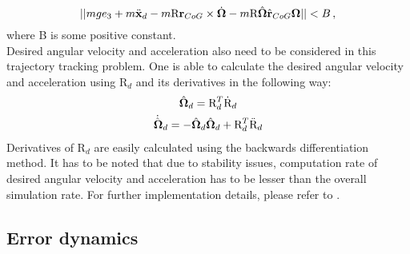 \begin{equation}
	|| mge_3 + m\ddot{\textbf{x}}_d 
	- m\text{R}\textbf{r}_{CoG}  \times \dot{\boldsymbol{\Omega}} - m\text{R}\hat{\boldsymbol{\Omega}}\hat{\textbf{r}}_{CoG}\boldsymbol{\Omega}|| < B \, , \label{condition2}
\end{equation}
where B is some positive constant. \\
\indent Desired angular velocity and acceleration also need to be considered in this trajectory tracking problem. One is able to calculate the desired angular velocity and acceleration using $\text{R}_d$ and its derivatives in the following way:
\begin{gather}
	\hat{\boldsymbol{\Omega}}_d = \text{R}_d^T \dot{\text{R}}_d \\
	\dot{\hat{\boldsymbol{\Omega}}}_d = - \hat{\boldsymbol{\Omega}}_d\hat{\boldsymbol{\Omega}}_d + \text{R}_d^T \ddot{\text{R}}_d
\end{gather}
Derivatives of $\text{R}_d$ are easily calculated using the backwards differentiation method. It has to be noted that due to stability issues, computation rate of desired angular velocity and acceleration has to be lesser than the overall simulation rate. For further implementation details, please refer to \cite{gitLink}.

\subsection{Error dynamics} \label{ssec:error_dynamics}

